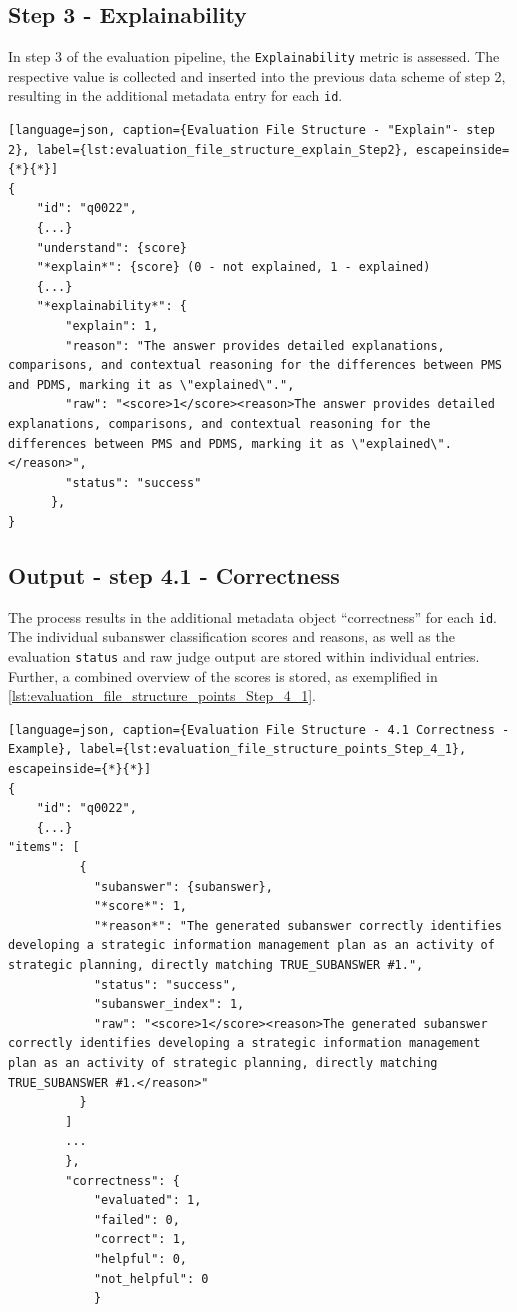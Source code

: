 \subsection{Step 3 - Explainability}\label{subsub:output_3_explain}
In step 3 of the evaluation pipeline, the \texttt{Explainability} metric is assessed.
The respective value is collected and inserted into the previous data scheme of step 2, resulting in the additional metadata entry for each \texttt{id}.

\begin{lstlisting}[language=json, caption={Evaluation File Structure - "Explain"- step 2}, label={lst:evaluation_file_structure_explain_Step2}, escapeinside={*}{*}]
{
    "id": "q0022",
    {...}
    "understand": {score}
    "*explain*": {score} (0 - not explained, 1 - explained)
    {...}
    "*explainability*": {
        "explain": 1,
        "reason": "The answer provides detailed explanations, comparisons, and contextual reasoning for the differences between PMS and PDMS, marking it as \"explained\".",
        "raw": "<score>1</score><reason>The answer provides detailed explanations, comparisons, and contextual reasoning for the differences between PMS and PDMS, marking it as \"explained\".</reason>",
        "status": "success"
      },
}
\end{lstlisting}
%
\subsection{Output - step 4.1 - Correctness}\label{subsub:output_4_1_correct}

The process results in the additional metadata object \enquote{correctness} for each \texttt{id}.
The individual subanswer classification scores and reasons, as well as the evaluation \texttt{status} and raw judge output are stored within individual entries.
Further, a combined overview of the scores is stored, as exemplified in \cref{lst:evaluation_file_structure_points_Step_4_1}.
%
\begin{lstlisting}[language=json, caption={Evaluation File Structure - 4.1 Correctness - Example}, label={lst:evaluation_file_structure_points_Step_4_1}, escapeinside={*}{*}]
{
    "id": "q0022",
    {...}
"items": [
          {
            "subanswer": {subanswer},
            "*score*": 1,
            "*reason*": "The generated subanswer correctly identifies developing a strategic information management plan as an activity of strategic planning, directly matching TRUE_SUBANSWER #1.",
            "status": "success",
            "subanswer_index": 1,
            "raw": "<score>1</score><reason>The generated subanswer correctly identifies developing a strategic information management plan as an activity of strategic planning, directly matching TRUE_SUBANSWER #1.</reason>"
          }
        ]
        ...
        },
        "correctness": {
            "evaluated": 1,
            "failed": 0,
            "correct": 1,
            "helpful": 0,
            "not_helpful": 0
            }
\end{lstlisting}
%
